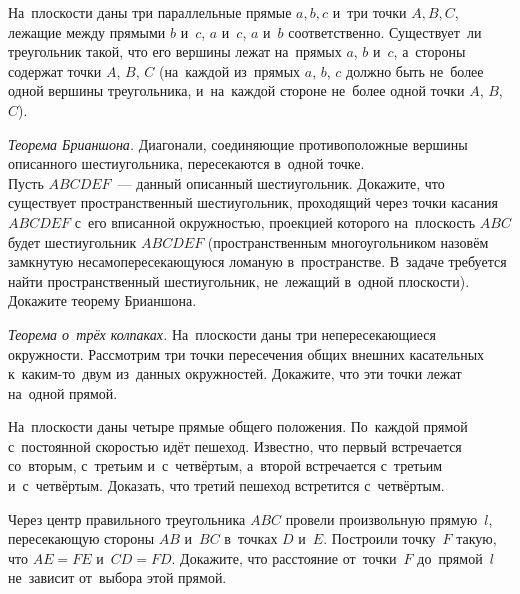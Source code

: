 \begin{problems}

\item
На~плоскости даны три параллельные прямые $a,b,c$ и~три точки $A,B,C$, лежащие
между прямыми $b$ и~$c$, $a$ и~$c$, $a$ и~$b$ соответственно.
Существует~ли треугольник такой, что его вершины лежат
на~прямых $a$, $b$ и~$c$, а~стороны содержат точки $A$, $B$, $C$
(на~каждой из~прямых $a$, $b$, $c$ должно быть не~более одной вершины
треугольника, и~на~каждой стороне не~более одной точки $A$, $B$, $C$).

\item\emph{Теорема Брианшона.}
Диагонали, соединяющие противоположные вершины описанного шестиугольника,
пересекаются в~одной точке.
\\
\sp
Пусть $ABCDEF$~--- данный описанный шестиугольник.
Докажите, что существует пространственный шестиугольник, проходящий через точки
касания $ABCDEF$ с~его вписанной окружностью, проекцией которого
на~плоскость $ABC$ будет шестиугольник $ABCDEF$ (пространственным
многоугольником назовём замкнутую несамопересекающуюся ломаную в~пространстве.
В~задаче требуется найти пространственный шестиугольник, не~лежащий в~одной
плоскости).
\\
\sp
Докажите теорему Брианшона.


\item\emph{Теорема о~трёх колпаках.}
На~плоскости даны три непересекающиеся окружности.
Рассмотрим три точки пересечения общих внешних касательных к~каким-то~двум
из~данных окружностей.
Докажите, что эти точки лежат на~одной прямой.

\item
На~плоскости даны четыре прямые общего положения.
По~каждой прямой с~постоянной скоростью идёт пешеход.
Известно, что первый встречается со~вторым, с~третьим и~с~четвёртым, а~второй
встречается с~третьим и~с~четвёртым.
Доказать, что третий пешеход встретится с~четвёртым.

\item
Через центр правильного треугольника $ABC$ провели произвольную прямую~$l$,
пересекающую стороны $AB$ и~$BC$ в~точках $D$ и~$E$.
Построили точку~$F$ такую, что $AE = FE$ и~$CD = FD$.
Докажите, что расстояние от~точки~$F$ до~прямой~$l$ не~зависит от~выбора этой
прямой.


\end{problems}
